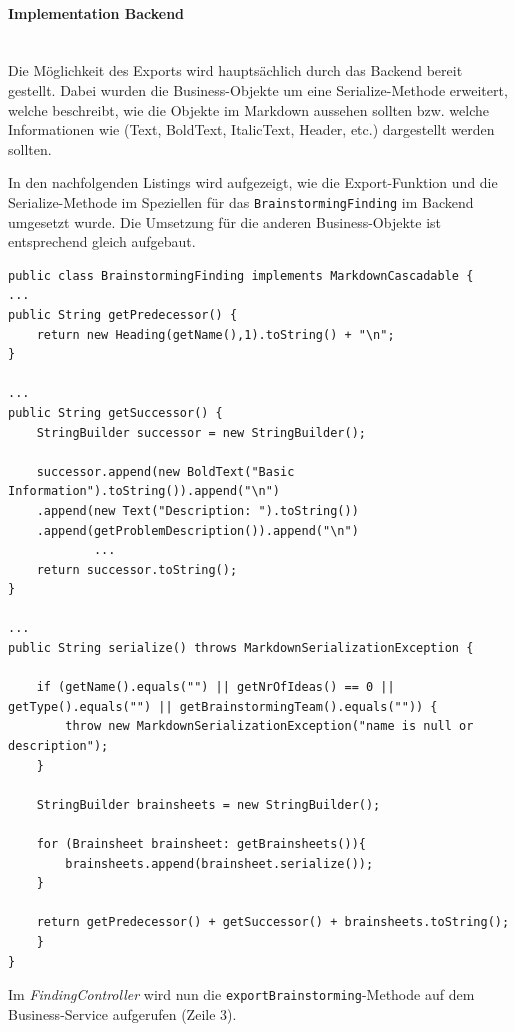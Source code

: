 \paragraph*{Implementation Backend}~\\
Die Möglichkeit des Exports wird hauptsächlich durch das Backend bereit gestellt. Dabei wurden die Business-Objekte um eine Serialize-Methode erweitert, welche beschreibt, wie die Objekte im Markdown aussehen sollten bzw. welche Informationen wie (Text, BoldText, ItalicText, Header, etc.) dargestellt werden sollten. 

In den nachfolgenden Listings wird aufgezeigt, wie die Export-Funktion und die Serialize-Methode im Speziellen für das \texttt{BrainstormingFinding} im Backend umgesetzt wurde. Die Umsetzung für die anderen Business-Objekte ist entsprechend gleich aufgebaut. 

\begin{lstlisting}[caption={Serialize-Methode von BrainstormingFinding}, label=markdownBrainstormingFinding]
public class BrainstormingFinding implements MarkdownCascadable {
...
public String getPredecessor() {
    return new Heading(getName(),1).toString() + "\n";
}

...
public String getSuccessor() {
    StringBuilder successor = new StringBuilder();

    successor.append(new BoldText("Basic Information").toString()).append("\n")
    .append(new Text("Description: ").toString())
    .append(getProblemDescription()).append("\n")
            ...
    return successor.toString();
}

...
public String serialize() throws MarkdownSerializationException {

    if (getName().equals("") || getNrOfIdeas() == 0 || getType().equals("") || getBrainstormingTeam().equals("")) {
        throw new MarkdownSerializationException("name is null or description");
    }

    StringBuilder brainsheets = new StringBuilder();

    for (Brainsheet brainsheet: getBrainsheets()){
        brainsheets.append(brainsheet.serialize());
    }
    
    return getPredecessor() + getSuccessor() + brainsheets.toString();
	}
}

\end{lstlisting}

Im \textit{FindingController} wird nun die \texttt{exportBrainstorming}-Methode auf dem Business-Service aufgerufen (Zeile 3).

